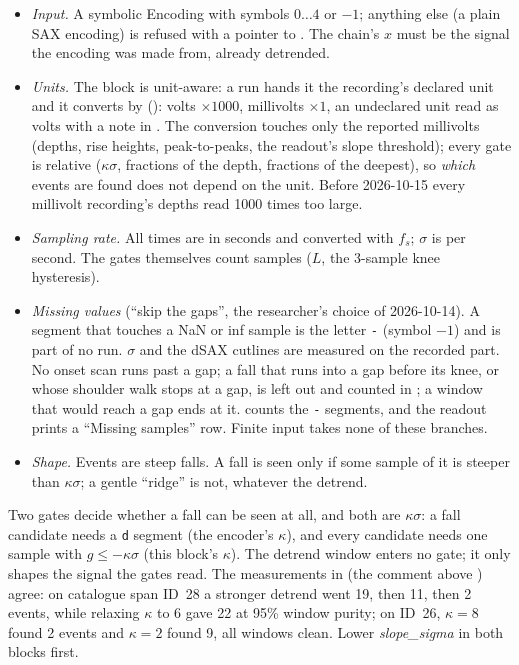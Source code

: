 \begin{itemize}
\item \emph{Input.} A symbolic Encoding with symbols $0\ldots4$ or $-1$; anything else (a plain
  SAX encoding) is refused with a pointer to . The chain's
  $x$ must be the signal the encoding was made from, already detrended.
\item \emph{Units.} The block is unit-aware: a run hands it the recording's declared unit and
  it converts by  (): volts $\times 1000$, millivolts
  $\times 1$, an undeclared unit read as volts with a note in . The
  conversion touches only the reported millivolts (depths, rise heights, peak-to-peaks, the
  readout's slope threshold); every gate is relative ($\kappa\sigma$, fractions of the depth,
  fractions of the deepest), so \emph{which} events are found does not depend on the unit.
  Before 2026-10-15 every millivolt recording's depths read 1000 times too large.
\item \emph{Sampling rate.} All times are in seconds and converted with $f_s$; $\sigma$ is per
  second. The gates themselves count samples ($L$, the 3-sample knee hysteresis).
\item \emph{Missing values} (``skip the gaps'', the researcher's choice of 2026-10-14). A
  segment that touches a NaN or inf sample is the letter \texttt{-} (symbol $-1$) and is part of
  no run. $\sigma$ and the dSAX cutlines are measured on the recorded part. No onset scan runs
  past a gap; a fall that runs into a gap before its knee, or whose shoulder walk stops at a
  gap, is left out and counted in ; a window that would reach
  a gap ends at it.  counts the \texttt{-} segments, and the
  readout prints a ``Missing samples'' row. Finite input takes none of these branches.
\item \emph{Shape.} Events are steep falls. A fall is seen only if some sample of it is
  steeper than $\kappa\sigma$; a gentle ``ridge'' is not, whatever the detrend.
\end{itemize}

\begin{watchout}
Two gates decide whether a fall can be seen at all, and both are $\kappa\sigma$: a fall
candidate needs a \texttt{d} segment (the encoder's $\kappa$), and every candidate needs one
sample with $g \le -\kappa\sigma$ (this block's $\kappa$). The detrend window enters no gate;
it only shapes the signal the gates read. The measurements in
 (the comment above ) agree: on
catalogue span ID~28 a stronger detrend went 19, then 11, then 2 events, while relaxing
$\kappa$ to 6 gave 22 at 95\% window purity; on ID~26, $\kappa = 8$ found 2 events and
$\kappa = 2$ found 9, all windows clean. Lower \emph{slope\_sigma} in both blocks first.
\end{watchout}

